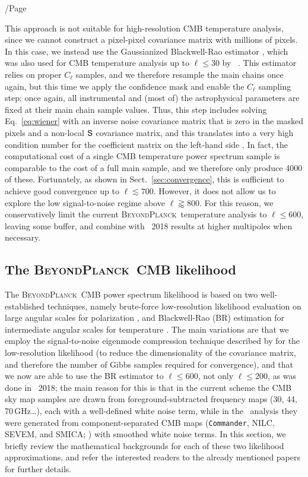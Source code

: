 /Page\documentclass[twocolumn]{aa}
\def\commander{\texttt{Commander}}
\renewcommand{\S}[0]{\tens{S}}
\newcommand{\BP}{\textsc{BeyondPlanck}}
\begin{document}
This approach is not suitable for high-resolution CMB temperature
analysis, since we cannot construct a pixel-pixel covariance matrix
with millions of pixels. In this case, we instead use the Gaussianized
Blackwell-Rao estimator \citep{chu2005,rudjord:2009}, which was also
used for CMB temperature analysis up to $\ell\le30$ by
\Planck\ \citep[e.g.,][]{planck2016-l05}. This estimator relies on
proper $C_{\ell}$ samples, and we therefore resample the main chains
once again, but this time we apply the confidence mask and enable the
$C_{\ell}$ sampling step; once again, all instrumental and (most of)
the astrophysical parameters are fixed at their main chain sample
values. Thus, this step includes solving Eq.~\eqref{eq:wiener} with an
inverse noise covariance matrix that is zero in the masked pixels and
a non-local $\S$ covariance matrix, and this translates into a very
high condition number for the coefficient matrix on the left-hand side
\citep{seljebotn:2019}. In fact, the computational cost of a single
CMB temperature power spectrum sample is comparable to the cost of a
full main sample, and we therefore only produce 4000 of
these. Fortunately, as shown in Sect.~\ref{sec:convergence}, this is
sufficient to achieve good convergence up to $\ell\lesssim
700$. However, it does not allow us to explore the low signal-to-noise
regime above $\ell\gtrapprox 800$. For this reason, we conservatively limit the current
\BP\ temperature analysis to $\ell\le 600$, leaving some buffer, and
combine with \Planck\ 2018 results at higher multipoles when
necessary.


\subsection{The \BP\ CMB likelihood}
\label{subsec:cmb_like_bp}

The \BP\ CMB power spectrum likelihood is based on two
well-established techniques, namely brute-force low-resolution
likelihood evaluation on large angular scales for polarization
\citep[e.g.,][]{page2007,planck2016-l05}, and Blackwell-Rao (BR)
estimation for intermediate angular scales for temperature
\citep{chu2005,rudjord:2009,planck2014-a13}. The main variations are
that we employ the signal-to-noise eigenmode compression technique
described by \citet{tegmark1997,gjerlow2015} for the low-resolution
likelihood (to reduce the dimensionality of the covariance matrix, and
therefore the number of Gibbs samples required for convergence), and
that we now are able to use the BR estimator to $\ell\le 600$, not
only $\ell\le200$, as was done in \Planck\ 2018; the main reason for
this is that in the current scheme the CMB sky map samples are drawn
from foreground-subtracted frequency maps (30, 44, 70\,GHz\ldots),
each with a well-defined white noise term, while in the
\Planck\ analysis they were generated from component-separated CMB
maps (\commander, NILC, SEVEM, and SMICA; \citealp{planck2016-l04})
with smoothed white noise terms. In this section, we briefly review
the mathematical backgrounds for each of these two likelihood
approximations, and refer the interested readers to the already
mentioned papers for further details.
\end{document}
